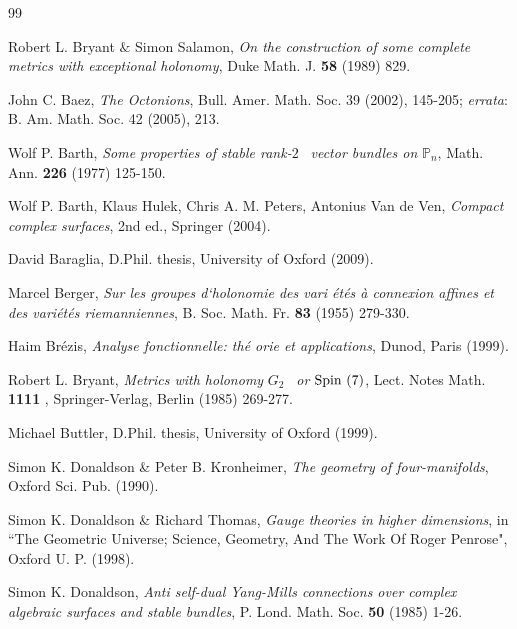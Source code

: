 \documentclass{article}
\newcommand{\func}[1]{\textnormal {#1\,}}
\begin{document}
\begin{thebibliography}{99}


 Robert L. Bryant $\&$ Simon Salamon, \emph{On
the construction of some complete metrics with exceptional holonomy}, Duke
Math. J. \textbf{58} (1989) 829.

 John C. Baez, \emph{The Octonions}, Bull. Amer. Math. Soc. 39 (2002), 145-205; \emph{errata}: B. Am. Math. Soc. 42 (2005), 213.

 Wolf P. Barth, \emph{Some properties of stable rank-}$2$%
\emph{\ vector bundles on }$\mathbb{P}_{n}$, Math. Ann. \textbf{226} (1977)
125-150.

 Wolf P. Barth, Klaus Hulek, Chris A. M. Peters, Antonius Van de Ven, \emph{Compact complex surfaces}, 2nd ed., Springer (2004). 

 David Baraglia, D.Phil. thesis, University of Oxford (2009).

 Marcel Berger, \emph{Sur les groupes d`holonomie des vari%
\'{e}t\'{e}s \`{a} connexion affines et des vari\'{e}t\'{e}s riemanniennes},
B. Soc. Math. Fr. \textbf{83} (1955) 279-330.

 Haim Br\'{e}zis, \emph{Analyse fonctionnelle: th\'{e}%
orie et applications}, Dunod, Paris (1999).

 Robert L. Bryant, \emph{Metrics with holonomy }$G_{2}$%
\emph{\ or }$\func{Spin}\left( 7\right) $, Lect. Notes Math. \textbf{1111%
}, Springer-Verlag, Berlin (1985) 269-277.

 Michael Buttler, D.Phil. thesis, University of Oxford
(1999).

 Simon K. Donaldson \& Peter B. Kronheimer, \emph{%
The geometry of four-manifolds}, Oxford Sci. Pub. (1990).

 Simon K. Donaldson \& Richard Thomas, \emph{%
Gauge theories in higher dimensions}, in ``The Geometric Universe; Science,
Geometry, And The Work Of Roger Penrose", Oxford U. P. (1998).


 Simon K. Donaldson, \emph{Anti self-dual
Yang-Mills connections over complex algebraic surfaces and stable bundles},
P. Lond. Math. Soc. \textbf{50 }(1985) 1-26.


\end{thebibliography}
\end{document}
